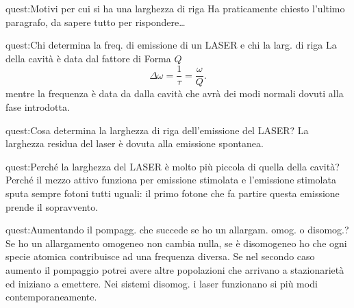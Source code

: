 \begin{quest}{quest:Motivi per cui si ha una larghezza di riga}
    Ha praticamente chiesto l'ultimo paragrafo, da sapere tutto per rispondere\ldots
\end{quest}
\begin{quest}{quest:Chi determina la freq. di emissione di un LASER e chi la larg. di riga}
La della cavità è data dal fattore di Forma $Q$
\[
    \Delta\omega  = \frac{1}{\tau}=\frac{\omega}{Q}
.\] 
mentre la frequenza è data da dalla cavità che avrà dei modi normali dovuti alla fase introdotta.
\end{quest}
\begin{quest}{quest:Cosa determina la larghezza di riga dell'emissione del LASER?}
La larghezza residua del laser è dovuta alla emissione spontanea.	
\end{quest}
\begin{quest}{quest:Perché la larghezza del LASER è molto più piccola di quella della cavità?}
Perché il mezzo attivo funziona per emissione stimolata e l'emissione stimolata sputa sempre fotoni tutti uguali: il primo fotone che fa partire questa emissione prende il sopravvento.
\end{quest}
\begin{quest}{quest:Aumentando il pompagg. che succede se ho un allargam. omog. o disomog.?}
Se ho un allargamento omogeneo non cambia nulla, se è disomogeneo ho che ogni specie atomica contribuisce ad una frequenza diversa. Se nel secondo caso aumento il pompaggio potrei avere altre popolazioni che arrivano a stazionarietà ed iniziano a emettere. Nei sistemi disomog. i laser funzionano si più modi contemporaneamente.
\end{quest}
